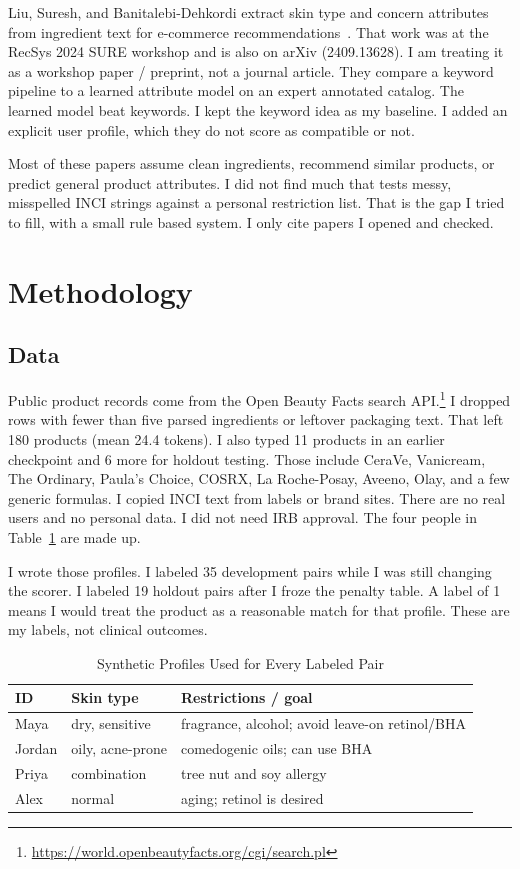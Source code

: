 \documentclass[conference]{IEEEtran}
\begin{document}
Liu, Suresh, and Banitalebi-Dehkordi extract skin type and concern attributes from ingredient text for e-commerce recommendations~\cite{liu2024beauty}. That work was at the RecSys 2024 SURE workshop and is also on arXiv (2409.13628). I am treating it as a workshop paper / preprint, not a journal article. They compare a keyword pipeline to a learned attribute model on an expert annotated catalog. The learned model beat keywords. I kept the keyword idea as my baseline. I added an explicit user profile, which they do not score as compatible or not.

Most of these papers assume clean ingredients, recommend similar products, or predict general product attributes. I did not find much that tests messy, misspelled INCI strings against a personal restriction list. That is the gap I tried to fill, with a small rule based system. I only cite papers I opened and checked.

\section{Methodology}
\subsection{Data}
Public product records come from the Open Beauty Facts search API.\footnote{\url{https://world.openbeautyfacts.org/cgi/search.pl}} I dropped rows with fewer than five parsed ingredients or leftover packaging text. That left 180 products (mean 24.4 tokens). I also typed 11 products in an earlier checkpoint and 6 more for holdout testing. Those include CeraVe, Vanicream, The Ordinary, Paula's Choice, COSRX, La Roche-Posay, Aveeno, Olay, and a few generic formulas. I copied INCI text from labels or brand sites. There are no real users and no personal data. I did not need IRB approval. The four people in Table~\ref{tab:profiles} are made up.

I wrote those profiles. I labeled 35 development pairs while I was still changing the scorer. I labeled 19 holdout pairs after I froze the penalty table. A label of 1 means I would treat the product as a reasonable match for that profile. These are my labels, not clinical outcomes.

\begin{table}[t]
\caption{Synthetic Profiles Used for Every Labeled Pair}
\label{tab:profiles}
\centering
\scriptsize
\begin{tabular}{@{}llp{4.6cm}@{}}
\toprule
ID & Skin type & Restrictions / goal \\
\midrule
Maya & dry, sensitive & fragrance, alcohol; avoid leave-on retinol/BHA \\
Jordan & oily, acne-prone & comedogenic oils; can use BHA \\
Priya & combination & tree nut and soy allergy \\
Alex & normal & aging; retinol is desired \\
\bottomrule
\end{tabular}
\end{table}
\end{document}
